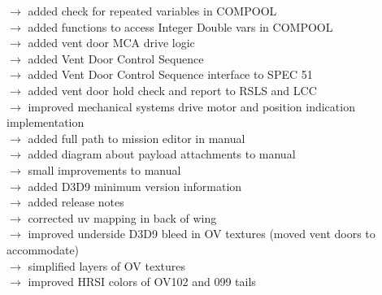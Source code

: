 \documentclass[Space_Shuttle_Vessel_Manual.tex]{subfiles}
\begin{document}
$\rightarrow$ added check for repeated variables in COMPOOL\\
$\rightarrow$ added functions to access Integer Double vars in COMPOOL\\
$\rightarrow$ added vent door MCA drive logic\\
$\rightarrow$ added Vent Door Control Sequence\\
$\rightarrow$ added Vent Door Control Sequence interface to SPEC 51\\
$\rightarrow$ added vent door hold check and report to RSLS and LCC\\
$\rightarrow$ improved mechanical systems drive motor and position indication implementation\\
$\rightarrow$ added full path to mission editor in manual\\
$\rightarrow$ added diagram about payload attachments to manual\\
$\rightarrow$ small improvements to manual\\
$\rightarrow$ added D3D9 minimum version information\\
$\rightarrow$ added release notes\\
$\rightarrow$ corrected uv mapping in back of wing\\
$\rightarrow$ improved underside D3D9 bleed in OV textures (moved vent doors to accommodate)\\
$\rightarrow$ simplified layers of OV textures\\
$\rightarrow$ improved HRSI colors of OV102 and 099 tails\\
\end{document}
